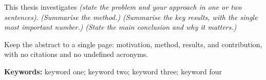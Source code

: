 
\noindent
This thesis investigates \emph{(state the problem and your approach in one
or two sentences)}. \emph{(Summarise the method.)} \emph{(Summarise the key
results, with the single most important number.)} \emph{(State the main
conclusion and why it matters.)}

Keep the abstract to a single page: motivation, method, results, and
contribution, with no citations and no undefined acronyms.

\vspace{1.5em}
\noindent\textbf{Keywords:} keyword one; keyword two; keyword three; keyword four
